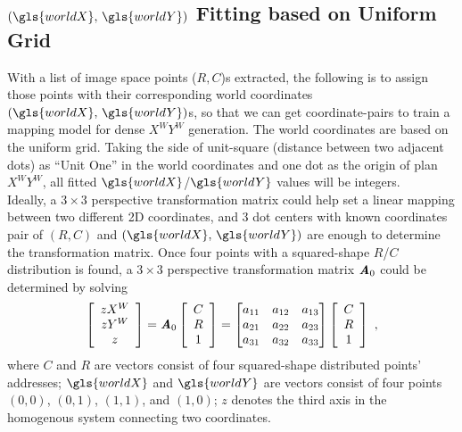\subsection{\((\gls{worldX}, \,\gls{worldY})\) Fitting based on Uniform Grid}
\label{uniformGridFittingXY}
With a list of image space points (\(R, C\))s extracted, the following is to assign those points with their corresponding world coordinates \((\gls{worldX}, \,\gls{worldY})\)s, so that we can get coordinate-pairs to train a mapping model for dense \(X^WY^W\) generation. The world coordinates are based on the uniform grid. Taking the side of unit-square (distance between two adjacent dots) as \enquote{Unit One} in the world coordinates and one dot as the origin of plan \(X^WY^W\), all fitted \(\gls{worldX}\)/\(\gls{worldY}\) values will be integers. %
\\\indent%
Ideally, a $3\times3$ perspective transformation matrix could help set a linear mapping between two different 2D coordinates, and 3 dot centers with known coordinates pair of \((R, C)\) and \((\gls{worldX}, \,\gls{worldY})\) are enough to determine the transformation matrix. Once four points with a squared-shape \(R\)/\(C\) distribution is found, a $3\times3$ perspective transformation matrix \(\textbf{\textit{A}}_0\) could be determined by solving 
\begin{equation}
%
\left[ \begin{array}{c} %
zX^W \\ zY^W \\ z \end{array} \right] %
= %
\textbf{\textit{A}}_0 \left[ \begin{array}{c} %
C \\ R \\ 1 \end{array} \right] %
= %
\begin{bmatrix} 
a_{11} & a_{12} & a_{13} \\
a_{21} & a_{22} & a_{23} \\
a_{31} & a_{32} & a_{33} \\
\end{bmatrix}%
 \left[ \begin{array}{c} %
C \\ R \\ 1 \end{array} \right] %
 \ ,%
\label{perspectiveDistortionCorrectionEquation}
\end{equation}%
%
\noindent
where \(C\) and \(R\) are vectors consist of four squared-shape distributed points' addresses; \(\gls{worldX}\) and \(\gls{worldY}\) are vectors consist of four points \((0, 0)\), \((0, 1)\), \((1, 1)\), and \((1, 0)\); \(z\) denotes the third axis in the homogenous system connecting two coordinates. %
